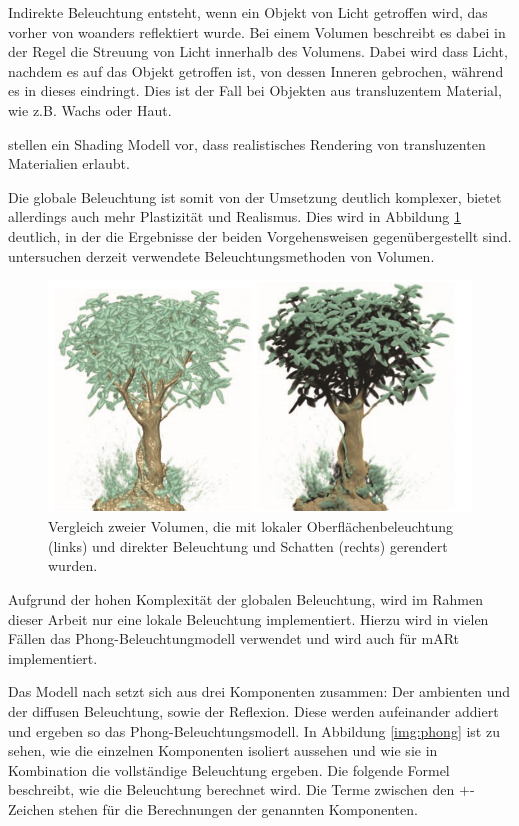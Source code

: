 Indirekte Beleuchtung entsteht, wenn ein Objekt von Licht getroffen wird, das vorher von woanders reflektiert wurde. Bei einem Volumen beschreibt es dabei in der Regel die Streuung von Licht innerhalb des Volumens. Dabei wird dass Licht, nachdem es auf das Objekt getroffen ist, von dessen Inneren gebrochen, während es in dieses eindringt. Dies ist der Fall bei Objekten aus transluzentem Material, wie z.B. Wachs oder Haut.

\cite{hansen02} stellen ein Shading Modell vor, dass realistisches Rendering von transluzenten Materialien erlaubt.

Die globale Beleuchtung ist somit von der Umsetzung deutlich komplexer, bietet allerdings auch mehr Plastizität und Realismus. Dies wird in Abbildung \ref{img:localGlobalIll} deutlich, in der die Ergebnisse der beiden Vorgehensweisen gegenübergestellt sind.
\cite{Jnsson14} untersuchen derzeit verwendete Beleuchtungsmethoden von Volumen.
\begin{figure}[!htb]
	\centering
	\includegraphics[width=0.7\linewidth]{images/localGlobalIllumination.png}
	\caption{Vergleich zweier Volumen, die mit lokaler Oberflächenbeleuchtung (links) und direkter Beleuchtung und Schatten (rechts) gerendert wurden.}
	\label{img:localGlobalIll}
\end{figure}
\FloatBarrier

Aufgrund der hohen Komplexität der globalen Beleuchtung, wird im Rahmen dieser Arbeit nur eine lokale Beleuchtung implementiert. 
Hierzu wird in vielen Fällen das Phong-Beleuchtungmodell verwendet und wird auch für mARt implementiert.

Das Modell nach \cite{phong75} setzt sich aus drei Komponenten zusammen: Der ambienten und der diffusen Beleuchtung, sowie der Reflexion. Diese werden aufeinander addiert und ergeben so das Phong-Beleuchtungsmodell. In Abbildung \ref{img:phong} ist zu sehen, wie die einzelnen Komponenten isoliert aussehen und wie sie in Kombination die vollständige Beleuchtung ergeben.
Die folgende Formel beschreibt, wie die Beleuchtung berechnet wird. Die Terme zwischen den $+$-Zeichen stehen für die Berechnungen der genannten Komponenten.


